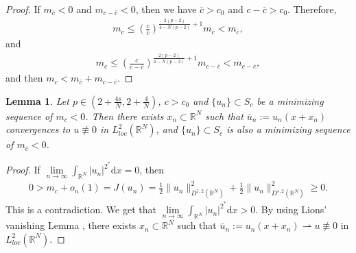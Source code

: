 \documentclass[12pt,a4paper,reqno]{amsart}
\numberwithin{equation}{section}
\newtheorem{lemma}{Lemma}[section]
\begin{document}
\begin{proof}
If $m_{\bar{c}}<0$ and $m_{c-\bar{c}}<0$, then we have $\bar{c}>c_{0}$ and $c-\bar{c}>c_{0}$. Therefore,
\begin{equation*}
\begin{aligned}
m_{c}\leqslant (\frac{c}{\bar{c}})^{\frac{2(p-2)}{4-N(p-2)}+1}m_{\bar{c}}<m_{\bar{c}},
\end{aligned}
\end{equation*}
and
\begin{equation*}
\begin{aligned}
m_{c}\leqslant (\frac{c}{c-\bar{c}})^{\frac{2(p-2)}{4-N(p-2)}+1}m_{c-\bar{c}}<m_{c-\bar{c}},
\end{aligned}
\end{equation*}
and then $m_{c}<m_{\bar{c}}+m_{c-\bar{c}}$.
\end{proof}





\begin{lemma}\label{Lemma3.2}
Let $p\in(2+\frac{4s}{N},2+\frac{4}{N})$, $c>c_{0}$ and $\{u_{n}\}\subset S_{c}$ be a minimizing sequence of $m_{c}<0$.
Then there exists $x_{n}\subset \mathbb{R}^{N}$ such that  $\bar{u}_{n}:=u_{n}(x+x_{n})$ convergences to $u\not \equiv0$ in $L_{loc}^{2}(\mathbb{R}^{N})$, and $\{u_{n}\}\subset S_{c}$ is also a minimizing sequence of $m_{c}<0$.
\end{lemma}
\begin{proof}
If $\lim\limits_{n\to\infty}\int_{\mathbb{R}^{N}}|u_{n}|^{2^{*}}\mathrm{d}x=0$, then
\begin{equation*}
\begin{aligned}
0>m_{c}+o_{n}(1)=J(u_{n})=
\frac{1}{2}\|u_{n}\|_{D^{1,2}(\mathbb{R}^{N})}^{2}
+\frac{1}{2}\|u_{n}\|_{D^{s,2}(\mathbb{R}^{N})}^{2}\geqslant 0.
\end{aligned}
\end{equation*}
This is a contradiction.
We get that $\lim\limits_{n\to\infty}\int_{\mathbb{R}^{N}}|u_{n}|^{2^{*}}\mathrm{d}x>0$.
By using Lions' vanishing Lemma \cite{Willem1996Book}, there exists $x_{n}\subset \mathbb{R}^{N}$ such that  $\bar{u}_{n}:=u_{n}(x+x_{n})\rightharpoonup u\not \equiv0$ in $L^{2}_{loc}(\mathbb{R}^{N})$.
\end{proof}
\end{document}
